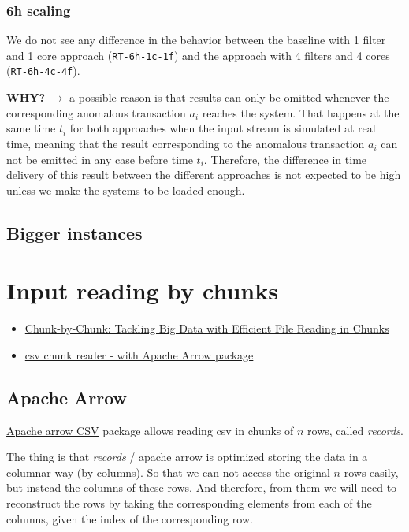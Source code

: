 \documentclass{article}
\begin{document}
\subsubsection{6h scaling}

We do not see any difference in the behavior between the baseline with 1 filter and 1 core approach (\texttt{RT-6h-1c-1f}) and the approach with 4 filters and 4 cores (\texttt{RT-6h-4c-4f}). 

\textbf{WHY?} $\rightarrow$ a possible reason is that results can only be omitted whenever the corresponding anomalous transaction $a_i$ reaches the system. That happens at the same time $t_i$ for both approaches when the input stream is simulated at real time, meaning that the result corresponding to the anomalous transaction $a_i$ can not be emitted in any case before time $t_i$. Therefore, the difference in time delivery of this result between the different approaches is not expected to be high unless we make the systems to be loaded enough.

\subsection{Bigger instances}

\newpage

\section{Input reading by chunks}

\begin{itemize}
  \item \href{https://medium.com/@anuragv.1020/chunk-by-chunk-tackling-big-data-with-efficient-file-reading-in-chunks-c6f7cf153ccd}{Chunk-by-Chunk: Tackling Big Data with Efficient File Reading in Chunks}
  \item \href{https://pkg.go.dev/github.com/apache/arrow/go/arrow/csv#NewReader}{csv chunk reader - with Apache Arrow package}
\end{itemize}

\subsection{Apache Arrow}

\href{https://pkg.go.dev/github.com/apache/arrow/go/v12@v12.0.1/arrow/csv}{Apache arrow CSV}
package allows reading csv in chunks of $n$ rows, called \emph{records}.

The thing is that \emph{records} / apache arrow is optimized storing the data in a columnar way (by columns). So that we can not access the original $n$ rows easily, but instead the columns of these rows. And therefore, from them we will need to reconstruct the rows by taking the corresponding elements from each of the columns, given the index of the corresponding row.
\end{document}
